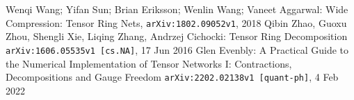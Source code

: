 \documentclass[11pt,a4paper,openright,oneside]{article}
\numberwithin{equation}{section}
\theoremstyle{definition}
\begin{document}
\begin{thebibliography}{25}
 Wenqi Wang; Yifan Sun; Brian Eriksson; Wenlin Wang; Vaneet Aggarwal: Wide Compression: Tensor Ring Nets, \texttt{arXiv:1802.09052v1}, 2018 
 Qibin Zhao, Guoxu Zhou, Shengli Xie, Liqing Zhang, Andrzej Cichocki: Tensor Ring Decomposition \texttt{arXiv:1606.05535v1 [cs.NA]}, 17 Jun 2016
 Glen Evenbly: A Practical Guide to the Numerical Implementation of Tensor Networks I: Contractions, Decompositions and Gauge Freedom \texttt{arXiv:2202.02138v1 [quant-ph]}, 4 Feb 2022

\end{thebibliography}
\end{document}
